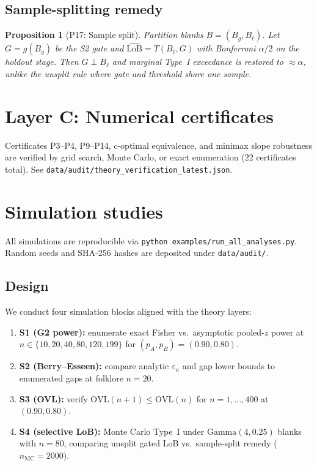 \documentclass[11pt,a4paper]{article}
\newtheorem{proposition}[theorem]{Proposition}
\theoremstyle{definition}
\begin{document}
\subsection{Sample-splitting remedy}

\begin{proposition}[P17: Sample split]\label{thm:P17}
Partition blanks $B=(B_g,B_\ell)$. Let $G=g(B_g)$ be the S2 gate and
$\widehat{\mathrm{LoB}}=T(B_\ell,G)$ with Bonferroni $\alpha/2$ on the holdout stage.
Then $G\perp B_\ell$ and marginal Type~I exceedance is restored to $\approx\alpha$,
unlike the unsplit rule where gate and threshold share one sample.
\end{proposition}

\section{Layer C: Numerical certificates}
\label{sec:layerC}

Certificates P3--P4, P9--P14, c-optimal equivalence, and minimax slope robustness
are verified by grid search, Monte Carlo, or exact enumeration (22 certificates total).
See \texttt{data/audit/theory\_verification\_latest.json}.

\section{Simulation studies}
\label{sec:simulation}

All simulations are reproducible via \texttt{python examples/run\_all\_analyses.py}.
Random seeds and SHA-256 hashes are deposited under \texttt{data/audit/}.

\subsection{Design}

We conduct four simulation blocks aligned with the theory layers:
\begin{enumerate}
  \item \textbf{S1 (G2 power):} enumerate exact Fisher vs.\ asymptotic pooled-$z$
        power at $n\in\{10,20,40,80,120,199\}$ for $(p_A,p_B)=(0.90,0.80)$.
  \item \textbf{S2 (Berry--Esseen):} compare analytic $\varepsilon_n$ and gap lower
        bounds to enumerated gaps at folklore $n=20$.
  \item \textbf{S3 (OVL):} verify $\mathrm{OVL}(n+1)\le\mathrm{OVL}(n)$ for
        $n=1,\ldots,400$ at $(0.90,0.80)$.
  \item \textbf{S4 (selective LoB):} Monte Carlo Type~I under $\mathrm{Gamma}(4,0.25)$
        blanks with $n=80$, comparing unsplit gated LoB vs.\ sample-split remedy
        ($n_{\mathrm{MC}}=2000$).
\end{enumerate}
\end{document}
